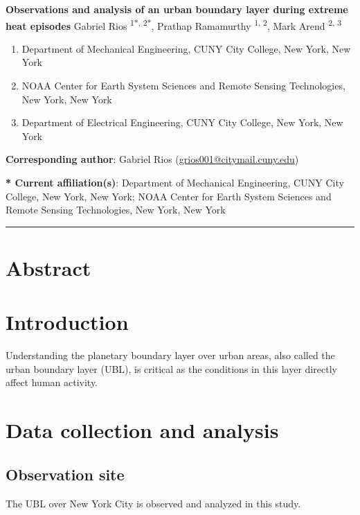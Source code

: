 \documentclass[11pt,a4paper]{article}
\begin{document}

\textbf{Observations and analysis of an urban boundary layer during extreme heat episodes}
Gabriel Rios \textsuperscript{1*, 2*}, Prathap Ramamurthy \textsuperscript{1, 2}, Mark Arend \textsuperscript{2, 3}

\small{
\begin{enumerate}[leftmargin=0cm, itemsep=0mm]
	\item Department of Mechanical Engineering, CUNY City College, New York, New York
	\item NOAA Center for Earth System Sciences and Remote Sensing Technologies, New York, New York
	\item Department of Electrical Engineering, CUNY City College, New York, New York
\end{enumerate}
}

\textbf{Corresponding author}: Gabriel Rios (\href{mailto:grios001@citymail.cuny.edu}{grios001@citymail.cuny.edu})

\textbf{* Current affiliation(s)}: Department of Mechanical Engineering, CUNY City College, New York, New York; NOAA Center for Earth System Sciences and Remote Sensing Technologies, New York, New York

\noindent\rule{\textwidth}{1pt}


\section*{Abstract}


\section{Introduction}
Understanding the planetary boundary layer over urban areas, also called the urban boundary layer (UBL), is critical as the conditions in this layer directly affect human activity.


\section{Data collection and analysis}

\subsection{Observation site}
The UBL over New York City is observed and analyzed in this study.
\end{document}
